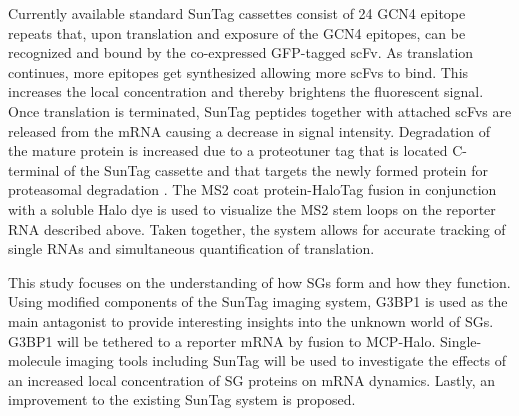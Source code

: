 Currently available standard SunTag cassettes consist of 24 GCN4 epitope repeats that, upon translation and exposure of the GCN4 epitopes, can be recognized and bound by the co-expressed GFP-tagged scFv.
As translation continues, more epitopes get synthesized allowing more scFvs to bind.
This increases the local concentration and thereby brightens the fluorescent signal.
Once translation is terminated, SunTag peptides together with attached scFvs are released from the mRNA causing a decrease in signal intensity.
Degradation of the mature protein is increased due to a proteotuner tag that is located C-terminal of the SunTag cassette and that targets the newly formed protein for proteasomal degradation \cite{azevedo_systematic_2012}.
The MS2 coat protein-HaloTag fusion in conjunction with a soluble Halo dye is used to visualize the MS2 stem loops on the reporter RNA described above.
Taken together, the system allows for accurate tracking of single RNAs and simultaneous quantification of translation.

This study focuses on the understanding of how SGs form and how they function.
Using modified components of the SunTag imaging system, G3BP1 is used as the main antagonist to provide interesting insights into the unknown world of SGs.
G3BP1 will be tethered to a reporter mRNA by fusion to MCP-Halo.
Single-molecule imaging tools including SunTag will be used to investigate the effects of an increased local concentration of SG proteins on mRNA dynamics.
Lastly, an improvement to the existing SunTag system is proposed.
